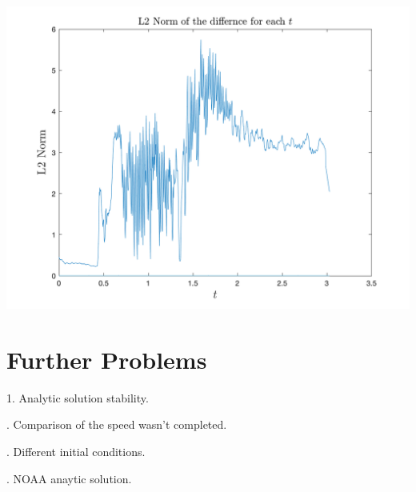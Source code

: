 \documentclass{article}
\begin{document}
\includegraphics[width=\linewidth]{l2.png}

\section{Further Problems}

1. Analytic solution stability.

. Comparison of the speed wasn't completed.

. Different initial conditions.

. NOAA anaytic solution.
\end{document}
